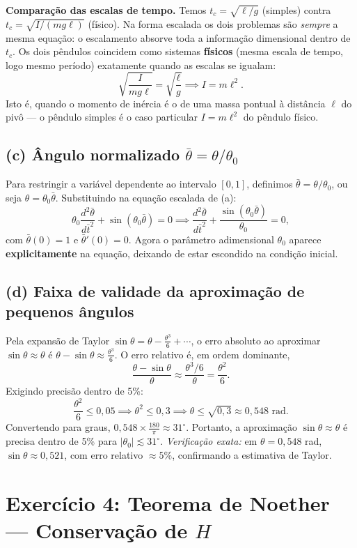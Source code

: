 \documentclass{article}
\begin{document}
\textbf{Comparação das escalas de tempo.} Temos $t_c = \sqrt{\ell/g}$ (simples) contra $t_c = \sqrt{I/(mg\ell)}$ (físico). Na forma escalada os dois problemas são \textit{sempre} a mesma equação: o escalamento absorve toda a informação dimensional dentro de $t_c$. Os dois pêndulos coincidem como sistemas \textbf{físicos} (mesma escala de tempo, logo mesmo período) exatamente quando as escalas se igualam:
\[ \sqrt{\frac{I}{mg\ell}} = \sqrt{\frac{\ell}{g}} \implies I = m\ell^2. \]
Isto é, quando o momento de inércia é o de uma massa pontual à distância $\ell$ do pivô --- o pêndulo simples é o caso particular $I = m\ell^2$ do pêndulo físico.

\subsection*{(c) Ângulo normalizado $\bar{\theta} = \theta/\theta_0$}
Para restringir a variável dependente ao intervalo $[0,1]$, definimos $\bar{\theta} = \theta/\theta_0$, ou seja $\theta = \theta_0\bar{\theta}$. Substituindo na equação escalada de (a):
\[ \theta_0\frac{d^2\bar{\theta}}{d\bar{t}^2} + \sin(\theta_0\bar{\theta}) = 0 \implies \frac{d^2\bar{\theta}}{d\bar{t}^2} + \frac{\sin(\theta_0\bar{\theta})}{\theta_0} = 0, \]
com $\bar{\theta}(0) = 1$ e $\bar{\theta}'(0) = 0$. Agora o parâmetro adimensional $\theta_0$ aparece \textbf{explicitamente} na equação, deixando de estar escondido na condição inicial.

\subsection*{(d) Faixa de validade da aproximação de pequenos ângulos}
Pela expansão de Taylor $\sin\theta = \theta - \frac{\theta^3}{6} + \cdots$, o erro absoluto ao aproximar $\sin\theta \approx \theta$ é $\theta - \sin\theta \approx \frac{\theta^3}{6}$. O erro relativo é, em ordem dominante,
\[ \frac{\theta - \sin\theta}{\theta} \approx \frac{\theta^3/6}{\theta} = \frac{\theta^2}{6}. \]
Exigindo precisão dentro de 5\%:
\[ \frac{\theta^2}{6} \le 0,05 \implies \theta^2 \le 0,3 \implies \theta \le \sqrt{0,3} \approx 0,548 \text{ rad}. \]
Convertendo para graus, $0,548 \times \frac{180}{\pi} \approx 31^\circ$. Portanto, a aproximação $\sin\theta \approx \theta$ é precisa dentro de 5\% para $|\theta_0| \lesssim 31^\circ$. \textit{Verificação exata:} em $\theta = 0,548$ rad, $\sin\theta \approx 0,521$, com erro relativo $\approx 5\%$, confirmando a estimativa de Taylor.

\section*{Exercício 4: Teorema de Noether — Conservação de $H$}
\end{document}
